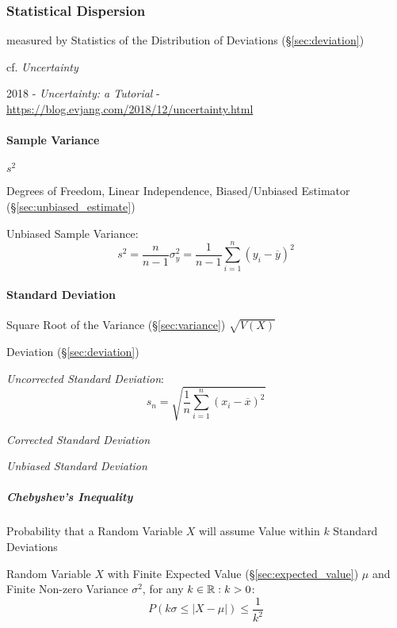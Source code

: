 \subsubsection{Statistical Dispersion}\label{sec:statistical_dispersion}

measured by Statistics of the Distribution of Deviations (\S\ref{sec:deviation})

cf. \emph{Uncertainty}

2018 - \emph{Uncertainty: a Tutorial} -
\url{https://blog.evjang.com/2018/12/uncertainty.html}



\paragraph{Sample Variance}\label{sec:variability}\hfill

$s^2$

Degrees of Freedom, Linear Independence, Biased/Unbiased Estimator
(\S\ref{sec:unbiased_estimate})

Unbiased Sample Variance:
\[
  s^2 = \frac{n}{n-1}\sigma^2_y =
  \frac{1}{n-1} \sum_{i=1}^n (y_i - \overline{y})^2
\]



\paragraph{Standard Deviation}\label{sec:standard_deviation}\hfill

Square Root of the Variance (\S\ref{sec:variance}) $\sqrt{V(X)}$

Deviation (\S\ref{sec:deviation})

\emph{Uncorrected Standard Deviation}:
\[
  s_n = \sqrt{\frac{1}{n}\sum_{i=1}^n (x_i - \overline{x})^2}
\]

\emph{Corrected Standard Deviation}

\emph{Unbiased Standard Deviation}



\subparagraph{Chebyshev's Inequality}\label{sec:chebyshevs_inequality}
\hfill

Probability that a Random Variable $X$ will assume Value within $k$ Standard
Deviations

Random Variable $X$ with Finite Expected Value (\S\ref{sec:expected_value})
$\mu$ and Finite Non-zero Variance $\sigma^2$, for any $k \in \mathbb{R} : k > 0$:
\[
  P(k\sigma \leq |X - \mu|) \leq \frac{1}{k^2}
\]



